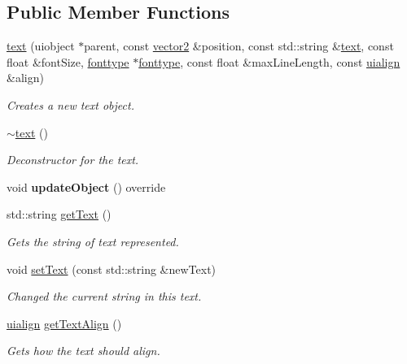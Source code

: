 \subsection*{Public Member Functions}
\begin{DoxyCompactItemize}
\item 
\hyperlink{classflounder_1_1text_a4b99960617867cc5159778aa42d99a19}{text} (uiobject $\ast$parent, const \hyperlink{classflounder_1_1vector2}{vector2} \&position, const std\+::string \&\hyperlink{classflounder_1_1text}{text}, const float \&font\+Size, \hyperlink{classflounder_1_1fonttype}{fonttype} $\ast$\hyperlink{classflounder_1_1fonttype}{fonttype}, const float \&max\+Line\+Length, const \hyperlink{namespaceflounder_a70f1871d5c05aa8e078dd37501ce10a9}{uialign} \&align)
\begin{DoxyCompactList}\small\item\em Creates a new text object. \end{DoxyCompactList}\item 
\hyperlink{classflounder_1_1text_af83a9cff2e1e78a7ec0203034375059b}{$\sim$text} ()
\begin{DoxyCompactList}\small\item\em Deconstructor for the text. \end{DoxyCompactList}\item 
\mbox{\label{classflounder_1_1text_a7f17850ab35de4e4797f699c1858e142}} 
void {\bfseries update\+Object} () override
\item 
std\+::string \hyperlink{classflounder_1_1text_a28cb4cb2a57a28135fececb6a467fd8f}{get\+Text} ()
\begin{DoxyCompactList}\small\item\em Gets the string of text represented. \end{DoxyCompactList}\item 
void \hyperlink{classflounder_1_1text_a4afc45fc499ba1aef7977aee18e9ef66}{set\+Text} (const std\+::string \&new\+Text)
\begin{DoxyCompactList}\small\item\em Changed the current string in this text. \end{DoxyCompactList}\item 
\hyperlink{namespaceflounder_a70f1871d5c05aa8e078dd37501ce10a9}{uialign} \hyperlink{classflounder_1_1text_a494f99a95dde793f20e9d2a46f34b217}{get\+Text\+Align} ()
\begin{DoxyCompactList}\small\item\em Gets how the text should align. \end{DoxyCompactList}\item 

\end{DoxyCompactItemize}
